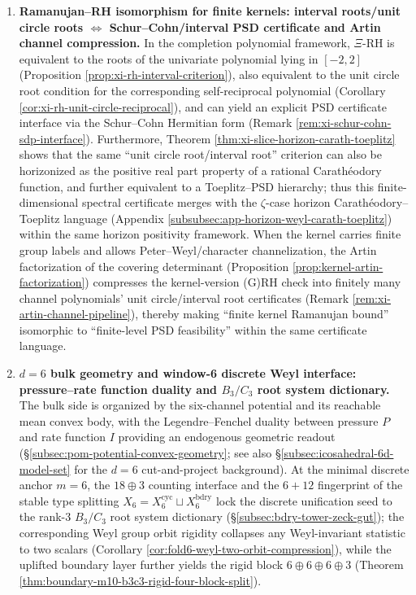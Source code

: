 \begin{enumerate}
  \item \textbf{Ramanujan--RH isomorphism for finite kernels: interval roots/unit circle roots \(\Leftrightarrow\) Schur--Cohn/interval PSD certificate and Artin channel compression.}
  In the completion polynomial framework, \(\Xi\)-RH is equivalent to the roots of the univariate polynomial lying in \([-2,2]\) (Proposition \ref{prop:xi-rh-interval-criterion}), also equivalent to the unit circle root condition for the corresponding self-reciprocal polynomial (Corollary \ref{cor:xi-rh-unit-circle-reciprocal}), and can yield an explicit PSD certificate interface via the Schur--Cohn Hermitian form (Remark \ref{rem:xi-schur-cohn-sdp-interface}).
  Furthermore, Theorem \ref{thm:xi-slice-horizon-carath-toeplitz} shows that the same ``unit circle root/interval root'' criterion can also be horizonized as the positive real part property of a rational Carath\'eodory function, and further equivalent to a Toeplitz--PSD hierarchy; thus this finite-dimensional spectral certificate merges with the \(\zeta\)-case horizon Carath\'eodory--Toeplitz language (Appendix \ref{subsubsec:app-horizon-weyl-carath-toeplitz}) within the same horizon positivity framework.
  When the kernel carries finite group labels and allows Peter--Weyl/character channelization, the Artin factorization of the covering determinant (Proposition \ref{prop:kernel-artin-factorization}) compresses the kernel-version (G)RH check into finitely many channel polynomials' unit circle/interval root certificates (Remark \ref{rem:xi-artin-channel-pipeline}), thereby making ``finite kernel Ramanujan bound'' isomorphic to ``finite-level PSD feasibility'' within the same certificate language.

  \item \textbf{\texorpdfstring{$d=6$}{d=6} bulk geometry and window-6 discrete Weyl interface: pressure--rate function duality and \texorpdfstring{$B_3/C_3$}{B3/C3} root system dictionary.}
  The bulk side is organized by the six-channel potential and its reachable mean convex body, with the Legendre--Fenchel duality between pressure \(P\) and rate function \(I\) providing an endogenous geometric readout (\S\ref{subsec:pom-potential-convex-geometry}; see also \S\ref{subsec:icosahedral-6d-model-set} for the \(d=6\) cut-and-project background).
  At the minimal discrete anchor \(m=6\), the \(18\oplus 3\) counting interface and the \(6+12\) fingerprint of the stable type splitting \(X_6=X_6^{\mathrm{cyc}}\sqcup X_6^{\mathrm{bdry}}\) lock the discrete unification seed to the rank-\(3\) \(B_3/C_3\) root system dictionary (\S\ref{subsec:bdry-tower-zeck-gut});
  the corresponding Weyl group orbit rigidity collapses any Weyl-invariant statistic to two scalars (Corollary \ref{cor:fold6-weyl-two-orbit-compression}), while the uplifted boundary layer further yields the rigid block \(6\oplus 6\oplus 6\oplus 3\) (Theorem \ref{thm:boundary-m10-b3c3-rigid-four-block-split}).


\end{enumerate}

